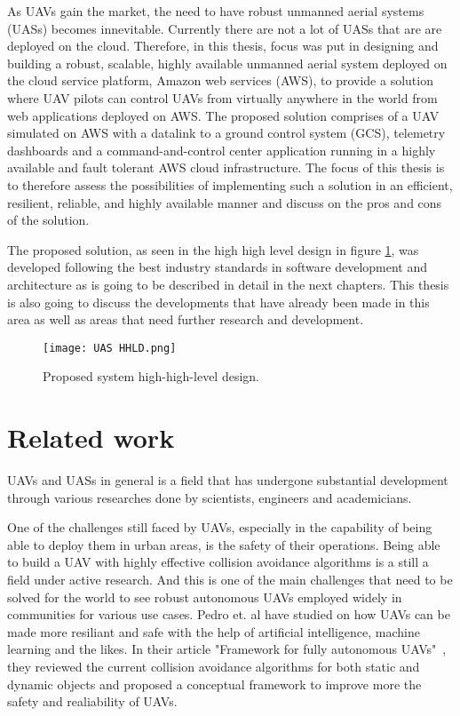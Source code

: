 As UAVs gain the market, the need to have robust unmanned aerial systems (UASs) becomes innevitable. Currently there are not a lot of UASs that are are deployed on the cloud. Therefore, in this thesis, focus was put in designing and building a robust, scalable, highly available unmanned aerial system deployed on the cloud service platform, Amazon web services (AWS), to provide a solution where UAV pilots can control UAVs from virtually anywhere in the world from web applications deployed on AWS. The proposed solution comprises of a UAV simulated on AWS with a datalink to a ground control system (GCS), telemetry dashboards and a command-and-control center application running in a highly available and fault tolerant AWS cloud infrastructure. The focus of this thesis is to therefore assess the possibilities of implementing such a solution in an efficient, resilient, reliable, and highly available manner and discuss on the pros and cons of the solution.

The proposed solution, as seen in the high high level design in figure \ref{fig:uas-hhld}, was developed following the best industry standards in software development and architecture as is going to be described in detail in the next chapters. This thesis is also going to discuss the developments that have already been made in this area as well as areas that need further research and development.

\begin{figure}[!htbp]
    \centering \texttt{[image: UAS HHLD.png]}
    \caption{Proposed system high-high-level design.}
    \label{fig:uas-hhld}
\end{figure}


\section{Related work}
\label{sec:related-work}

UAVs and UASs in general is a field that has undergone substantial development through various researches done by scientists, engineers and academicians.

One of the challenges still faced by UAVs, especially in the capability of being able to deploy them in urban areas, is the safety of their operations. Being able to build a UAV with highly effective collision avoidance algorithms is a still a field under active research. And this is one of the main challenges that need to be solved for the world to see robust autonomous UAVs employed widely in communities for various use cases. Pedro et. al have studied on how UAVs can be made more resiliant and safe with the help of artificial intelligence, machine learning and the likes. In their article "Framework for fully autonomous UAVs"~\cite{Pedro2020}, they reviewed the current collision avoidance algorithms for both static and dynamic objects and proposed a conceptual framework to improve more the safety and realiability of UAVs.

